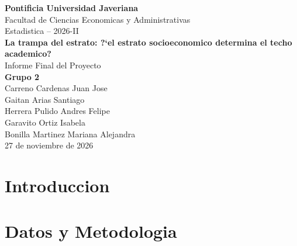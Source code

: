 \documentclass[11pt, a4paper]{article}
\begin{document}
\begin{center}
{\Large \textbf{Pontificia Universidad Javeriana}}\\[0.3cm]
Facultad de Ciencias Economicas y Administrativas\\[0.3cm]
Estadistica -- 2026-II\\[1cm]
{\LARGE \textbf{La trampa del estrato: ?`el estrato socioeconomico determina el techo academico?}}\\[0.5cm]
{\large Informe Final del Proyecto}\\[1cm]
\textbf{Grupo 2}\\[0.3cm]
Carreno Cardenas Juan Jose\\
Gaitan Arias Santiago\\
Herrera Pulido Andres Felipe\\
Garavito Ortiz Isabela\\
Bonilla Martinez Mariana Alejandra\\[1cm]
27 de noviembre de 2026
\end{center}

\newpage
\tableofcontents
\newpage

\section{Introduccion}

\section{Datos y Metodologia}
\end{document}
